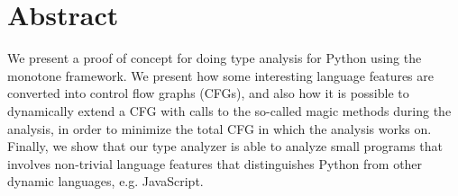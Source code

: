 \chapter*{Abstract}
We present a proof of concept for doing type analysis for Python using the monotone framework. We present how some interesting language features are converted into control flow graphs (CFGs), and also how it is possible to dynamically extend a CFG with calls to the so-called magic methods during the analysis, in order to minimize the total CFG in which the analysis works on. Finally, we show that our type analyzer is able to analyze small programs that involves non-trivial language features that distinguishes Python from other dynamic languages, e.g. JavaScript.